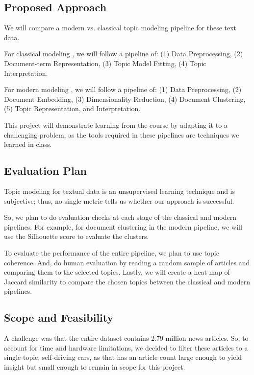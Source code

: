 \documentclass{article}
\begin{document}
\subsection*{Proposed Approach}

We will compare a modern vs. classical topic modeling pipeline for these text data. 

For classical modeling \parencite{qamar2024}, we will follow a pipeline of: (1) Data Preprocessing, (2) Document-term Representation, (3) Topic Model Fitting, (4) Topic Interpretation.

For modern modeling \parencite{alammar2024, kumari2026}, we will follow a pipeline of: (1) Data Preprocessing, (2) Document Embedding, (3) Dimensionality Reduction, (4) Document Clustering, (5) Topic Representation, and Interpretation.

This project will demonstrate learning from the course by adapting it to a challenging problem, as the tools required in these pipelines are techniques we learned in class.

\subsection*{Evaluation Plan}  

Topic modeling for textual data is an unsupervised learning technique and is subjective; thus, no single metric tells us whether our approach is successful.

So, we plan to do evaluation checks at each stage of the classical and modern pipelines. For example, for document clustering in the modern pipeline, we will use the Silhouette score to evaluate the clusters.

To evaluate the performance of the entire pipeline, we plan to use topic coherence. And, do human evaluation by reading a random sample of articles and comparing them to the selected topics. Lastly, we will create a heat map of Jaccard similarity to compare the chosen topics between the classical and modern pipelines. 


\subsection*{Scope and Feasibility}
A challenge was that the entire dataset contains 2.79 million news articles. So, to account for time and hardware limitations, we decided to filter these articles to a single topic, self-driving cars, as that has an article count large enough to yield insight but small enough to remain in scope for this project. 
\end{document}
